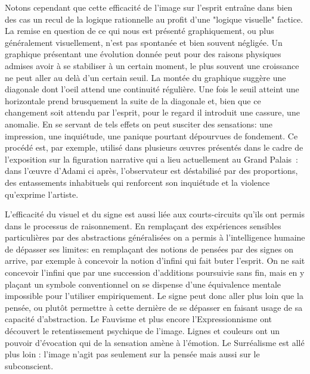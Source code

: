 \xspace
	Notons cependant que cette efficacité de l'image sur l'esprit entraîne dans bien des cas un recul de la logique rationnelle au profit d'une "logique visuelle" factice. La remise en question de ce qui nous est présenté graphiquement, ou plus généralement visuellement, n'est pas spontanée et bien souvent négligée. Un graphique présentant une évolution donnée peut pour des raisons physiques admises avoir à se stabiliser à un certain moment, le plus souvent une croissance ne peut aller au delà d'un certain seuil. La montée du graphique suggère une diagonale dont l'oeil attend une continuité régulière. Une fois le seuil atteint  une horizontale prend brusquement la suite de la diagonale et, bien que ce changement soit attendu par l'esprit, pour le regard il introduit une cassure, une anomalie. En se servant de tels effets on peut susciter des sensations: une impression, une inquiétude, une panique pourtant dépourvues de fondement. Ce procédé est, par exemple, utilisé dans plusieurs œuvres présentés dans le cadre de l’exposition sur la figuration narrative qui a lieu actuellement au Grand Palais : dans l’œuvre d’Adami ci après, l’observateur est déstabilisé par des proportions, des entassements inhabituels qui renforcent son inquiétude et la violence qu’exprime l’artiste. 

\xspace
	L'efficacité du visuel et du signe est aussi liée aux courts-circuits qu'ils ont permis dans le processus de raisonnement. En remplaçant des expériences sensibles particulières par des abstractions généralisées on a permis à l'intelligence humaine de dépasser ses limites: en remplaçant des notions de pensées par des signes on arrive, par exemple à concevoir la notion d'infini qui fait buter l'esprit. On ne sait  concevoir l'infini que par une succession d'additions poursuivie sans fin, mais en y plaçant un symbole conventionnel on se dispense d'une équivalence mentale impossible pour l'utiliser empiriquement. Le signe peut donc aller plus loin que la pensée, ou plutôt permettre à cette dernière de se dépasser en faisant usage de sa capacité d'abstraction. Le Fauvisme et plus encore l'Expressionnisme ont découvert le retentissement psychique de l'image. Lignes et couleurs ont un pouvoir d'évocation qui de la sensation amène à l'émotion. Le Surréalisme est allé plus loin : l'image n'agit  pas seulement sur la pensée mais aussi sur le subconscient.
